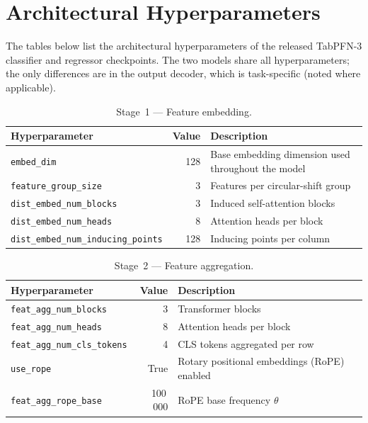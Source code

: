 \section{Architectural Hyperparameters}\label{app:architecture-hyperparams}

The tables below list the architectural hyperparameters of the released TabPFN-3 classifier and regressor checkpoints.
The two models share all hyperparameters; the only differences are in the output decoder, which is task-specific (noted where applicable).

\begin{table}[H]
\centering
\small
\caption{Stage~1 — Feature embedding.}
\begin{tabular}{lrl}
\toprule
\textbf{Hyperparameter} & \textbf{Value} & \textbf{Description} \\
\midrule
\texttt{embed\_dim}                         & 128 & Base embedding dimension used throughout the model \\
\texttt{feature\_group\_size}               & 3   & Features per circular-shift group \\
\texttt{dist\_embed\_num\_blocks}           & 3   & Induced self-attention blocks \\
\texttt{dist\_embed\_num\_heads}            & 8   & Attention heads per block \\
\texttt{dist\_embed\_num\_inducing\_points} & 128 & Inducing points per column \\
\bottomrule
\end{tabular}
\end{table}

\begin{table}[h]
\centering
\small
\caption{Stage~2 — Feature aggregation.}
\begin{tabular}{lrl}
\toprule
\textbf{Hyperparameter} & \textbf{Value} & \textbf{Description} \\
\midrule
\texttt{feat\_agg\_num\_blocks}     & 3        & Transformer blocks \\
\texttt{feat\_agg\_num\_heads}      & 8        & Attention heads per block \\
\texttt{feat\_agg\_num\_cls\_tokens} & 4       & CLS tokens aggregated per row \\
\texttt{use\_rope}                  & True     & Rotary positional embeddings (RoPE) enabled \\
\texttt{feat\_agg\_rope\_base}      & 100\,000 & RoPE base frequency $\theta$ \\
\bottomrule
\end{tabular}
\end{table}

